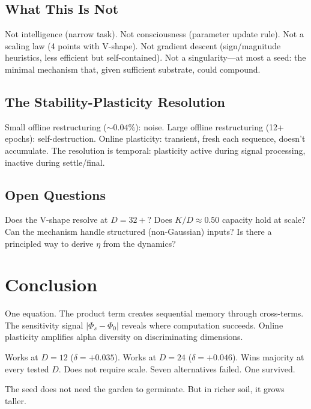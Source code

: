 \documentclass[11pt,a4paper]{article}
\begin{document}
\subsection{What This Is Not}

Not intelligence (narrow task). Not consciousness (parameter update rule). Not a scaling law (4 points with V-shape). Not gradient descent (sign/magnitude heuristics, less efficient but self-contained). Not a singularity---at most a seed: the minimal mechanism that, given sufficient substrate, could compound.

\subsection{The Stability-Plasticity Resolution}

Small offline restructuring (${\sim}0.04\%$): noise. Large offline restructuring (12+ epochs): self-destruction. Online plasticity: transient, fresh each sequence, doesn't accumulate. The resolution is temporal: plasticity active during signal processing, inactive during settle/final.

\subsection{Open Questions}

Does the V-shape resolve at $D{=}32{+}$? Does $K/D \approx 0.50$ capacity hold at scale? Can the mechanism handle structured (non-Gaussian) inputs? Is there a principled way to derive $\eta$ from the dynamics?

\section{Conclusion}
\label{sec:conclusion}

One equation. The product term creates sequential memory through cross-terms. The sensitivity signal $|\Phi_s - \Phi_0|$ reveals where computation succeeds. Online plasticity amplifies alpha diversity on discriminating dimensions.

Works at $D{=}12$ ($\delta{=}+0.035$). Works at $D{=}24$ ($\delta{=}+0.046$). Wins majority at every tested $D$. Does not require scale. Seven alternatives failed. One survived.

The seed does not need the garden to germinate. But in richer soil, it grows taller.
\end{document}
